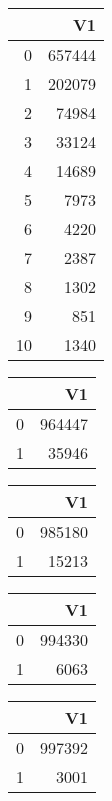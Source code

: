 \bigskip\bigskip
\centering
\begin{tabular}{rr}
  \hline
 & V1 \\ 
  \hline
0 & 657444 \\ 
  1 & 202079 \\ 
  2 & 74984 \\ 
  3 & 33124 \\ 
  4 & 14689 \\ 
  5 & 7973 \\ 
  6 & 4220 \\ 
  7 & 2387 \\ 
  8 & 1302 \\ 
  9 & 851 \\ 
  10 & 1340 \\ 
   \hline
\end{tabular}

\bigskip\bigskip
\centering
\begin{tabular}{rr}
  \hline
 & V1 \\ 
  \hline
0 & 964447 \\ 
  1 & 35946 \\ 
   \hline
\end{tabular}

\bigskip\bigskip
\centering
\begin{tabular}{rr}
  \hline
 & V1 \\ 
  \hline
0 & 985180 \\ 
  1 & 15213 \\ 
   \hline
\end{tabular}

\bigskip\bigskip
\centering
\begin{tabular}{rr}
  \hline
 & V1 \\ 
  \hline
0 & 994330 \\ 
  1 & 6063 \\ 
   \hline
\end{tabular}

\bigskip\bigskip
\centering
\begin{tabular}{rr}
  \hline
 & V1 \\ 
  \hline
0 & 997392 \\ 
  1 & 3001 \\ 
   \hline
\end{tabular}

